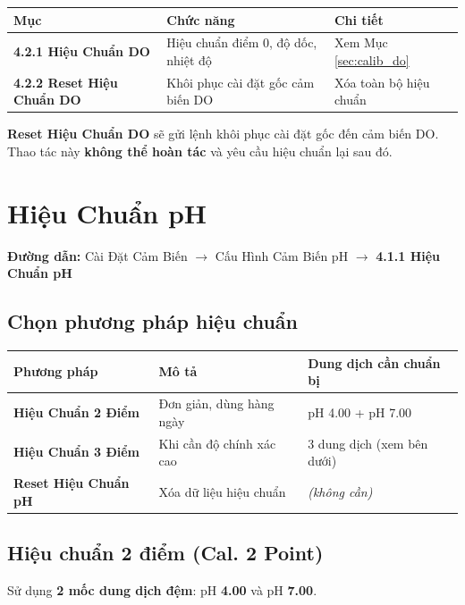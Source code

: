 \documentclass[12pt,a4paper]{article}
\begin{document}
\begin{table}[H]
\centering
\begin{tabularx}{\textwidth}{|l|l|X|}
\hline
\textbf{Mục} & \textbf{Chức năng} & \textbf{Chi tiết} \\ \hline
\textbf{4.2.1 Hiệu Chuẩn DO} & Hiệu chuẩn điểm 0, độ dốc, nhiệt độ & Xem Mục \ref{sec:calib_do} \\ \hline
\textbf{4.2.2 Reset Hiệu Chuẩn DO} & Khôi phục cài đặt gốc cảm biến DO & Xóa toàn bộ hiệu chuẩn \\ \hline
\end{tabularx}
\end{table}

\begin{warningbox}
\textbf{Reset Hiệu Chuẩn DO} sẽ gửi lệnh khôi phục cài đặt gốc đến cảm biến DO. Thao tác này \textbf{không thể hoàn tác} và yêu cầu hiệu chuẩn lại sau đó.
\end{warningbox}


\section{Hiệu Chuẩn pH}
\label{sec:calib_ph}

\textbf{Đường dẫn:} Cài Đặt Cảm Biến $\rightarrow$ Cấu Hình Cảm Biến pH $\rightarrow$ \textbf{4.1.1 Hiệu Chuẩn pH}

\subsection{Chọn phương pháp hiệu chuẩn}
\begin{table}[H]
\centering
\begin{tabularx}{\textwidth}{|l|l|X|}
\hline
\textbf{Phương pháp} & \textbf{Mô tả} & \textbf{Dung dịch cần chuẩn bị} \\ \hline
\textbf{Hiệu Chuẩn 2 Điểm} & Đơn giản, dùng hàng ngày & pH 4.00 + pH 7.00 \\ \hline
\textbf{Hiệu Chuẩn 3 Điểm} & Khi cần độ chính xác cao & 3 dung dịch (xem bên dưới) \\ \hline
\textbf{Reset Hiệu Chuẩn pH} & Xóa dữ liệu hiệu chuẩn & \textit{(không cần)} \\ \hline
\end{tabularx}
\end{table}

\subsection{Hiệu chuẩn 2 điểm (Cal. 2 Point)}
Sử dụng \textbf{2 mốc dung dịch đệm}: pH \textbf{4.00} và pH \textbf{7.00}.
\end{document}

